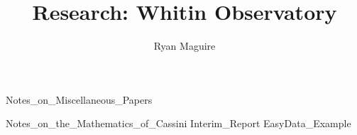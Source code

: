 \documentclass[crop=false,class=book,oneside]{standalone}
\begin{document}
    \newif\ifresearchwhitinobservatory
    \ifx\ifresearch\undefined
        \title{Research: Whitin Observatory}
        \author{Ryan Maguire}
        \date{\vspace{-5ex}}
        \maketitle
        \tableofcontents
        \listoffigures
        \listoftables
        \clearpage
        \graphicspath{{../../images/}}
    \fi
    
              {Notes_on_Miscellaneous_Papers}
    
              {Notes_on_the_Mathematics_of_Cassini}
    {Interim_Report}
    {EasyData_Example}
\end{document}
